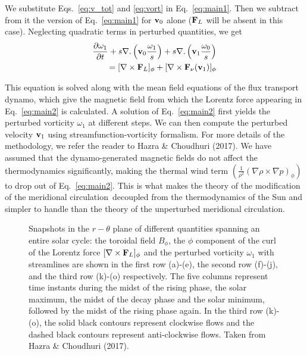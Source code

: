 \documentclass{iau}
\def\MC{meridional circulation}
\def\vb{{\bf v}}
\def\Fn{{\bf F}_{\nu}}
\def\FL{{\bf F}_L}
\begin{document}
We substitute Eqs.~\ref{eq:v_tot} and \ref{eq:vort} in Eq.~\ref{eq:main1}. Then we subtract from 
it the version of Eq.~\ref{eq:main1} for $\vb_0$ alone (${\bf F}_L$ will be absent in this case). Neglecting 
quadratic terms in perturbed quantities, we get
\begin{eqnarray}
\label{eq:main2}
\frac{\partial \omega_1}{\partial t} + s \nabla. \left(\vb_0 \frac{\omega_1}{s}\right) + 
s \nabla. \left( \vb_1 \frac{\omega_0}{s}\right) \\ ~\nonumber
= [\nabla \times \FL]_{\phi} + [\nabla \times \Fn(\vb_1)]_{\phi}
\end{eqnarray} 

This equation is solved along with the mean field equations of the flux transport dynamo, which give
the magnetic field from which the Lorentz force appearing in Eq.~\ref{eq:main2} is calculated.
A solution of Eq.~\ref{eq:main2} first yields the perturbed vorticity $\omega_1$
at different steps. We can then compute the perturbed velocity $\vb_1$ using streamfunction-vorticity formalism.
For more details of the methodology, we refer the reader to Hazra \& Choudhuri (2017).
We have assumed that the dynamo-generated magnetic fields do not
affect the thermodynamics significantly, making the thermal wind term $(\frac{1}{\rho^2}(\nabla \rho \times \nabla p)_{\phi})$ to drop out of Eq.~\ref{eq:main2}.
This is what makes the theory of the modification of the \MC\ decoupled from the
thermodynamics of the Sun and simpler to handle than the theory of the unperturbed \MC.


\begin{figure}
\caption{Snapshots in the $r-\theta$ plane of different quantities spanning an entire solar cycle: the toroidal field
$B_{\phi}$, the $\phi$ component of the curl of the Lorentz force $[\nabla \times \FL]_{\phi}$
and the perturbed vorticity $\omega_1$ with streamlines are shown in the first row (a)-(e), the second row (f)-(j), and 
the third row (k)-(o) respectively. The five columns represent time instants during
the midst of the rising phase, the solar maximum, the midst of the decay phase and the solar minimum,
followed by the midst of the rising phase again. In the third row (k)-(o), the solid black contours represent clockwise flows and the dashed black contours 
represent anti-clockwise flows. Taken from Hazra \& Choudhuri (2017).} 
\label{fig:snap_1d12}
\end{figure}
\end{document}
